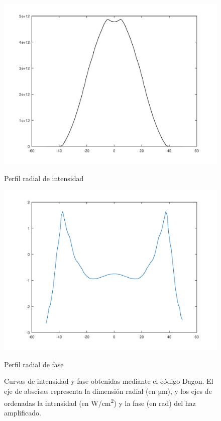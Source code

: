 \begin{figure}[htbp]
  \centering
  \begin{subcaptionblock}{.4\textwidth}
    \centering
    \includegraphics[width=\textwidth]{Figuras/ch2_intens.png}
    \caption{Perfil radial de intensidad}\label{fig:ch2_intensidad}
  \end{subcaptionblock}
  \begin{subcaptionblock}{.4\textwidth}
    \centering
    \includegraphics[width=\textwidth]{Figuras/ch2_fase.png}
    \caption{Perfil radial de fase}\label{fig:ch2_fase}
  \end{subcaptionblock}
  \caption{Curvas de intensidad y fase obtenidas mediante el código Dagon. El eje de abscisas representa la dimensión radial (en \unit{µm}), y los ejes de ordenadas la intensidad (en \unit{W/cm^{2}}) y la fase (en \unit{rad}) del haz amplificado.} 
   \label{fig:2.1}
\end{figure}

